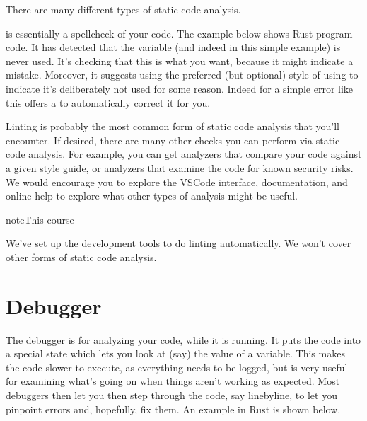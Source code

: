\documentclass[letterpaper,10pt,british]{sphinxmanual}
\let\sphinxpxdimen\pdfpxdimen\else\newdimen\sphinxpxdimen
\begin{document}
\sphinxAtStartPar
There are many different types of static code analysis.

\sphinxAtStartPar
{} is essentially a spell\sphinxhyphen{}check of your code. The example below shows Rust program code. It has detected that the variable  (and indeed  in this simple example) is never used. It’s checking that this is what you want, because it might indicate a mistake. Moreover, it suggests using the preferred (but optional) style of using  to indicate it’s deliberately not used for some reason. Indeed for a simple error like this offers a  to automatically correct it for you.

\begin{figure}[htbp]
\centering

\noindent\sphinxincludegraphics[width=800\sphinxpxdimen]{{linting}.png}
\end{figure}

\sphinxAtStartPar
Linting is probably the most common form of static code analysis that you’ll encounter. If desired, there are many other checks you can perform via static code analysis. For example, you can get analyzers that compare your code against a given style guide, or analyzers that examine the code for known security risks. We would encourage you to explore the VSCode interface, documentation, and online help to explore what other types of analysis might be useful.

\begin{sphinxadmonition}{note}{This course}

\sphinxAtStartPar
We’ve set up the development tools to do linting automatically. We won’t cover other forms of static code analysis.
\end{sphinxadmonition}

\sphinxstepscope


\section{Debugger}
\label{\detokenize{chapters/software_development_tools/debugger:debugger}}\label{\detokenize{chapters/software_development_tools/debugger:id1}}\label{\detokenize{chapters/software_development_tools/debugger::doc}}
\sphinxAtStartPar
The debugger is for analyzing your code, while it is running. It puts the code into a special state which lets you look at (say) the value of a variable. This makes the code slower to execute, as everything needs to be logged, but is very useful for examining what’s going on when things aren’t working as expected. Most debuggers then let you then step through the code, say line\sphinxhyphen{}by\sphinxhyphen{}line, to let you pin\sphinxhyphen{}point errors and, hopefully, fix them. An example in Rust is shown below.
\end{document}
